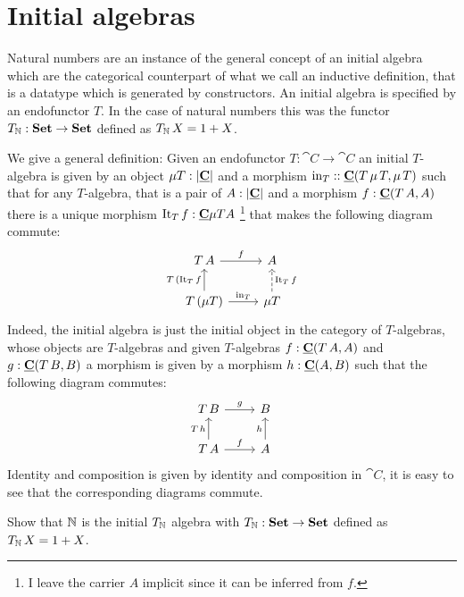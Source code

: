\section{Initial algebras}
\label{sec:initial-algebras}

Natural numbers are an instance of the general concept of an initial algebra which are the categorical counterpart of what we call an inductive definition, that is a datatype which is generated by constructors. An initial algebra is specified by an endofunctor $T$. In the case of natural numbers this was the functor $T_{\mathbb{N}} : \mathbf{Set} \to \mathbf{Set}$ defined as $T_{\mathbb{N}}\,X = 1+X$. 

We give a general definition: Given an endofunctor $T : \cat{C} \to \cat{C}$ an initial $T$-algebra is given by an object $\mu T : |\underline{\mathbf{C}}|$ and a morphism $\mathrm{in}_T : : \underline{\mathbf{C}}(T\,\mu\,T,\mu\,T)$ such that for any $T$-algebra, that is a pair of $A : |\underline{\mathbf{C}}|$ and a morphism 
$f : \underline{\mathbf{C}}(T\,A,A)$ there is a unique morphism $\mathrm{It}_T \,f: \underline{\mathbf{C}}{\mu T}{A}$
\footnote{I leave the carrier $A$ implicit since it can be inferred from $f$.}
that makes the following diagram commute:
\[\begin{tikzcd}
T\,A \arrow[r,"f"]  & A \\
T\,(\mu T) \arrow[u, "T\, (\It_T \, f"]  \arrow[r,"\inn_T"] & \mu T \arrow[u,"\It_T \, f" right,dashrightarrow]
\end{tikzcd}\]  
Indeed, the initial algebra is just the initial object in the category of $T$-algebras, whose objects are $T$-algebras and given $T$-algebras $f : \underline{\mathbf{C}}(T\,A,A)$ and $g : \underline{\mathbf{C}}(T\,B,B)$ a morphism is given by a morphism $h : \underline{\mathbf{C}}(A,B)$ such that the following diagram commutes:
\[\begin{tikzcd}
T\,B \arrow[r,"g"] & B \\
 T\,A \arrow[r,"f"] \arrow[u,"T\,h"]  & A \arrow[u,"h"] 
\end{tikzcd}\]  
Identity and composition is given by identity and composition in $\cat{C}$, it is easy to see that the corresponding diagrams commute. 

\begin{exercise}
Show that $\mathbb{N}$ is the initial $T_{\mathbb{N}}$ algebra with $T_{\mathbb{N}} : \mathbf{Set} \to \mathbf{Set}$ defined as $T_{\mathbb{N}}\,X = 1+X$. 
\end{exercise}

